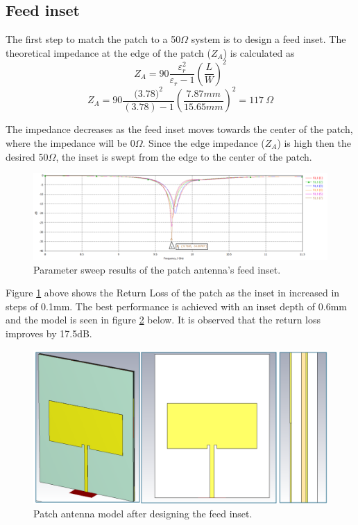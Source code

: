 \subsection{Feed inset}
The first step to match the patch to a 50$\Omega$ system is to design a feed inset. The theoretical impedance at the edge of the patch (\(Z_A\)) is calculated as
    \[Z_A=90\frac{\varepsilon_r^2}{\varepsilon_r-1}\left(\frac{L}{W}\right)^2\]
    \[Z_A=90\frac{({3.78)}^2}{(3.78)-1}\left(\frac{7.87mm}{15.65mm}\right)^2=117\ \Omega\]

The impedance decreases as the feed inset moves towards the center of the patch, where the impedance will be 0$\Omega$. Since the edge impedance (\(Z_A\)) is high then the desired 50$\Omega$, the inset is swept from the edge to the center of the patch.

    \begin{figure}[H]
    \centering
    \includegraphics[width=0.95\linewidth]{Figures/chp3_CPW_patch_inset_sweep_results.png}
    \caption{Parameter sweep results of the patch antenna's feed inset.}
    \label{fig:chp3_CPW_patch_inset_sweep_results}
    \end{figure}

Figure \ref{fig:chp3_CPW_patch_inset_sweep_results} above shows the Return Loss of the patch as the inset in increased in steps of 0.1mm. The best performance is achieved with an inset depth of 0.6mm and the model is seen in figure \ref{fig:chp3_CPW_patch_inset} below. It is observed that the return loss improves by 17.5dB.

    \begin{figure}[H]
    \centering
    \includegraphics[width=0.5\linewidth]{Figures/chp3_CPW_patch_inset.png}
    \caption{Patch antenna model after designing the feed inset.}
    \label{fig:chp3_CPW_patch_inset}
    \end{figure}


